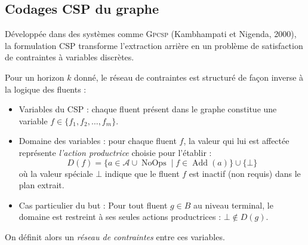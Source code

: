 \subsection{Codages CSP du graphe}

Développée dans des systèmes comme \textsc{Gpcsp} (Kambhampati et Nigenda, 2000), la formulation CSP transforme l'extraction arrière en un problème de satisfaction de contraintes à variables discrètes.

\begin{definition}
    Pour un horizon $k$ donné, le réseau de contraintes est structuré de façon inverse à la logique des fluents :
    \begin{itemize}
        \item {Variables du CSP :} chaque fluent présent dans le graphe constitue une variable $f \in \{f_1, f_2, \dots, f_m\}$.
        \item {Domaine des variables :} pour chaque fluent $f$, la valeur qui lui est affectée représente \emph{l'action productrice} choisie pour l'établir :
        \begin{equation}
            D(f) = \{ a \in \mathcal{A} \cup \operatorname{NoOps} \mid f \in \operatorname{Add}(a) \} \cup \{ \bot \}
        \end{equation}
        où la valeur spéciale $\bot$ indique que le fluent $f$ est inactif (non requis) dans le plan extrait.
        \item {Cas particulier du but :} Pour tout fluent $g \in B$ au niveau terminal, le domaine est restreint à ses seules actions productrices : $\bot \notin D(g)$.
    \end{itemize}
\end{definition}

On définit alors un \emph{réseau de contraintes} entre ces variables.

